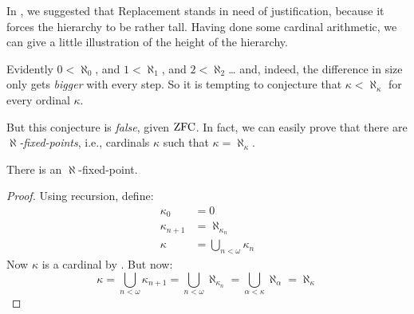 \documentclass[../../../include/open-logic-section]{subfiles}
\begin{document}

In , we suggested that Replacement stands in need
of justification, because it forces the hierarchy to be rather tall.
Having done some cardinal arithmetic, we can give a little
illustration of the height of the hierarchy. 

Evidently $0 < \aleph_0$, and $1 < \aleph_1$, and $2 < \aleph_2$\ldots
and, indeed, the difference in size only gets \emph{bigger} with every
step. So it is tempting to conjecture that $\kappa < \aleph_\kappa$
for every ordinal $\kappa$. 

But this conjecture is \emph{false}, given $\mathrm{ZFC}$. In fact, we can
easily prove that there are \emph{$\aleph$-fixed-points}, i.e.,
cardinals $\kappa$ such that $\kappa=\aleph_\kappa$. 

\begin{prop}
There is an $\aleph$-fixed-point.
\end{prop}

\begin{proof}
Using recursion, define:
\begin{align*}
	\kappa_0 &= 0\\
	\kappa_{n+1} &= \aleph_{\kappa_n}\\
	\kappa &= \bigcup_{n < \omega}\kappa_n
\end{align*}
Now $\kappa$ is a cardinal by
. But now:
\[
	\kappa = \bigcup_{n < \omega} \kappa_{n+1} = 
	\bigcup_{n < \omega}\aleph_{\kappa_n} = 
	\bigcup_{\alpha < \kappa}\aleph_\alpha = \aleph_\kappa 
\]
\end{proof}
\end{document}
